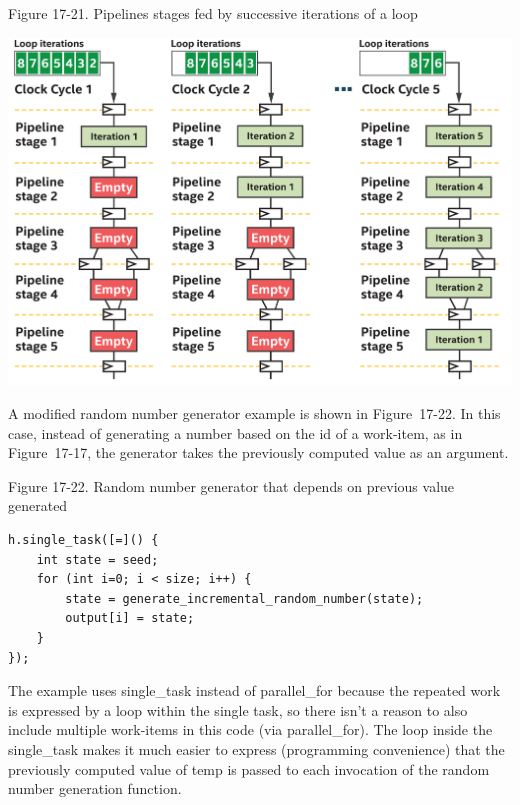 \hspace*{\fill} \par %
Figure 17-21. Pipelines stages fed by successive iterations of a loop
\begin{center}
	\includegraphics[width=1.0\textwidth]{content/chapter-17/images/17}
\end{center}

A modified random number generator example is shown in Figure 17-22. In this case, instead of generating a number based on the id of a work-item, as in Figure 17-17, the generator takes the previously computed value as an argument.\par

\hspace*{\fill} \par %
Figure 17-22. Random number generator that depends on previous value generated
\begin{lstlisting}[caption={}]
h.single_task([=]() {
	int state = seed;
	for (int i=0; i < size; i++) {
		state = generate_incremental_random_number(state);
		output[i] = state;
	}
});
\end{lstlisting}

The example uses single\_task instead of parallel\_for because the repeated work is expressed by a loop within the single task, so there isn’t a reason to also include multiple work-items in this code (via parallel\_for). The loop inside the single\_task makes it much easier to express (programming convenience) that the previously computed value of temp is passed to each invocation of the random number generation function.\par

